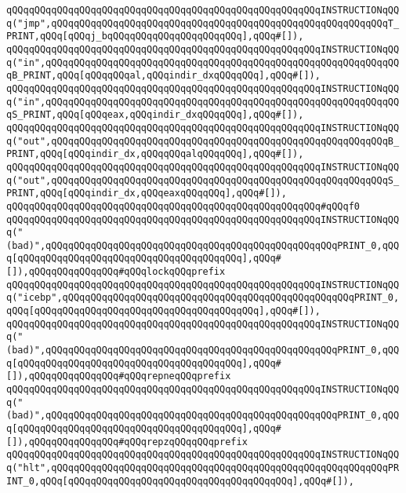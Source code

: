 \verb|qQQqqQQqqQQqqQQqqQQqqQQqqQQqqQQqqQQqqQQqqQQqqQQqqQQqqQQqINSTRUCTIONqQQq("jmp",qQQqqQQqqQQqqQQqqQQqqQQqqQQqqQQqqQQqqQQqqQQqqQQqqQQqqQQqqQQqT_PRINT,qQQq[qQQqj_bqQQqqQQqqQQqqQQqqQQqqQQq],qQQq#[]),|\newline
\verb|qQQqqQQqqQQqqQQqqQQqqQQqqQQqqQQqqQQqqQQqqQQqqQQqqQQqqQQqINSTRUCTIONqQQq("in",qQQqqQQqqQQqqQQqqQQqqQQqqQQqqQQqqQQqqQQqqQQqqQQqqQQqqQQqqQQqqQQqB_PRINT,qQQq[qQQqqQQqal,qQQqindir_dxqQQqqQQq],qQQq#[]),|\newline
\verb|qQQqqQQqqQQqqQQqqQQqqQQqqQQqqQQqqQQqqQQqqQQqqQQqqQQqqQQqINSTRUCTIONqQQq("in",qQQqqQQqqQQqqQQqqQQqqQQqqQQqqQQqqQQqqQQqqQQqqQQqqQQqqQQqqQQqqQQqS_PRINT,qQQq[qQQqeax,qQQqindir_dxqQQqqQQq],qQQq#[]),|\newline
\verb|qQQqqQQqqQQqqQQqqQQqqQQqqQQqqQQqqQQqqQQqqQQqqQQqqQQqqQQqINSTRUCTIONqQQq("out",qQQqqQQqqQQqqQQqqQQqqQQqqQQqqQQqqQQqqQQqqQQqqQQqqQQqqQQqqQQqB_PRINT,qQQq[qQQqindir_dx,qQQqqQQqalqQQqqQQq],qQQq#[]),|\newline
\verb|qQQqqQQqqQQqqQQqqQQqqQQqqQQqqQQqqQQqqQQqqQQqqQQqqQQqqQQqINSTRUCTIONqQQq("out",qQQqqQQqqQQqqQQqqQQqqQQqqQQqqQQqqQQqqQQqqQQqqQQqqQQqqQQqqQQqS_PRINT,qQQq[qQQqindir_dx,qQQqeaxqQQqqQQq],qQQq#[]),|\newline
\verb|qQQqqQQqqQQqqQQqqQQqqQQqqQQqqQQqqQQqqQQqqQQqqQQqqQQqqQQq#qQQqf0|\newline
\verb|qQQqqQQqqQQqqQQqqQQqqQQqqQQqqQQqqQQqqQQqqQQqqQQqqQQqqQQqINSTRUCTIONqQQq("(bad)",qQQqqQQqqQQqqQQqqQQqqQQqqQQqqQQqqQQqqQQqqQQqqQQqqQQqPRINT_0,qQQq[qQQqqQQqqQQqqQQqqQQqqQQqqQQqqQQqqQQqqQQq],qQQq#[]),qQQqqQQqqQQqqQQq#qQQqlockqQQqprefix|\newline
\verb|qQQqqQQqqQQqqQQqqQQqqQQqqQQqqQQqqQQqqQQqqQQqqQQqqQQqqQQqINSTRUCTIONqQQq("icebp",qQQqqQQqqQQqqQQqqQQqqQQqqQQqqQQqqQQqqQQqqQQqqQQqqQQqPRINT_0,qQQq[qQQqqQQqqQQqqQQqqQQqqQQqqQQqqQQqqQQqqQQq],qQQq#[]),|\newline
\verb|qQQqqQQqqQQqqQQqqQQqqQQqqQQqqQQqqQQqqQQqqQQqqQQqqQQqqQQqINSTRUCTIONqQQq("(bad)",qQQqqQQqqQQqqQQqqQQqqQQqqQQqqQQqqQQqqQQqqQQqqQQqqQQqPRINT_0,qQQq[qQQqqQQqqQQqqQQqqQQqqQQqqQQqqQQqqQQqqQQq],qQQq#[]),qQQqqQQqqQQqqQQq#qQQqrepneqQQqprefix|\newline
\verb|qQQqqQQqqQQqqQQqqQQqqQQqqQQqqQQqqQQqqQQqqQQqqQQqqQQqqQQqINSTRUCTIONqQQq("(bad)",qQQqqQQqqQQqqQQqqQQqqQQqqQQqqQQqqQQqqQQqqQQqqQQqqQQqPRINT_0,qQQq[qQQqqQQqqQQqqQQqqQQqqQQqqQQqqQQqqQQqqQQq],qQQq#[]),qQQqqQQqqQQqqQQq#qQQqrepzqQQqqQQqprefix|\newline
\verb|qQQqqQQqqQQqqQQqqQQqqQQqqQQqqQQqqQQqqQQqqQQqqQQqqQQqqQQqINSTRUCTIONqQQq("hlt",qQQqqQQqqQQqqQQqqQQqqQQqqQQqqQQqqQQqqQQqqQQqqQQqqQQqqQQqqQQqPRINT_0,qQQq[qQQqqQQqqQQqqQQqqQQqqQQqqQQqqQQqqQQqqQQq],qQQq#[]),|\newline

